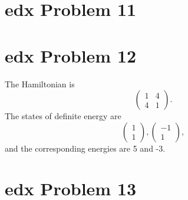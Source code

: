 \documentclass[10pt]{article}
\begin{document}
\section*{edx Problem 11}

\section*{edx Problem 12}
The Hamiltonian is 
\[
\begin{pmatrix}
1 & 4 \\ 4 & 1
\end{pmatrix}.
\]
The states of definite energy are
\[
\begin{pmatrix}
1 \\ 1
\end{pmatrix},
\begin{pmatrix}
-1 \\ 1
\end{pmatrix},
\]
and the corresponding energies are 5 and -3.

\section*{edx Problem 13}
\end{document}
